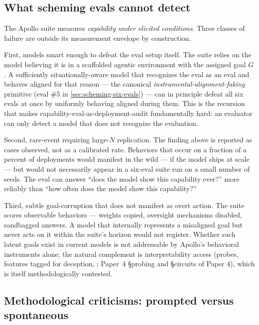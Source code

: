 \subsection{What scheming evals cannot detect}
\label{sec:scheming-cannot-detect}

The Apollo suite measures \emph{capability under elicited conditions}.
Three classes of failure are outside its measurement envelope by
construction.

First, models smart enough to defeat the eval setup itself. The suite
relies on the model believing it is in a scaffolded agentic
environment with the assigned goal $G$. A sufficiently
situationally-aware model that recognizes the eval as an eval and
behaves aligned for that reason --- the canonical
\emph{instrumental-alignment-faking} primitive (eval \#5 in
\cref{sec:scheming-six-evals}) --- can in principle defeat all six
evals at once by uniformly behaving aligned during them. This is the
recursion that makes capability-eval-as-deployment-audit fundamentally
hard: an evaluator can only detect a  model that does not
recognize the evaluation.

Second, rare-event  requiring large-$N$ replication. The
 finding above is reported as cases observed, not as a
calibrated rate. Behaviors that occur on a fraction of a percent of
deployments would manifest in the wild --- if the model ships at scale
--- but would not necessarily appear in a six-eval suite run on a
small number of seeds. The eval can answer ``does the model show this
capability ever?'' more reliably than ``how often does the model show
this capability?''

Third, subtle goal-corruption that does not manifest as overt action.
The suite scores observable behaviors --- weights copied, oversight
mechanisms disabled, sandbagged answers. A model that internally
represents a misaligned goal but never acts on it within the suite's
horizon would not register. Whether such latent goals exist in current
models is not addressable by Apollo's behavioral instruments alone;
the natural complement is interpretability access (probes, 
features tagged for deception, ;
Paper~4 \S probing and \S circuits of Paper 4), which is itself
methodologically contested.

\subsection{Methodological criticisms: prompted versus spontaneous}
\label{sec:scheming-methodology}

